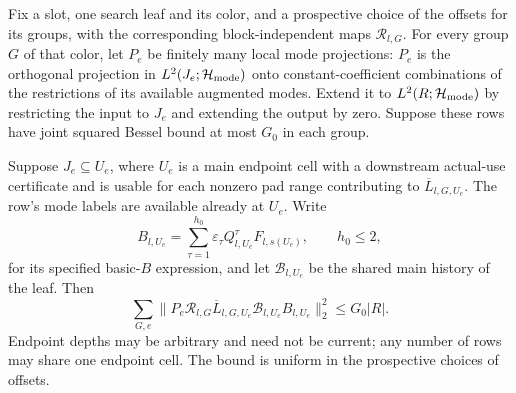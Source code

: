 \begin{lemma}
\label{lem:h-frozen-composition}
Fix a slot, one search leaf and its color, and a prospective choice
of the offsets for its groups, with the corresponding block-independent
maps \(\mathcal R_{l,G}\).  For every group \(G\) of that color, let \(P_e\) be finitely many
local mode projections: \(P_e\) is the orthogonal projection in
\(L^2(J_e;\mathcal H_{\rm mode})\) onto constant-coefficient combinations
of the restrictions of its available augmented modes.  Extend it to
\(L^2(R;\mathcal H_{\rm mode})\) by restricting the input to \(J_e\)
and extending the output by zero.  Suppose these rows have joint squared
Bessel bound at most \(G_0\) in each group.

Suppose \(J_e\subseteq U_e\), where \(U_e\) is a main endpoint
cell with a downstream actual-use certificate and is usable for
each nonzero pad range contributing to
\(\overline L_{l,G,U_e}\).  The row's mode labels are available
already at \(U_e\).  Write
\[
 B_{l,U_e}=\sum_{\tau=1}^{h_0}\varepsilon_\tau
       Q^\tau_{l,U_e}F_{l,s(U_e)},\qquad h_0\le2,
\]
for its specified basic-\(B\) expression, and let
\(\mathcal B_{l,U_e}\) be the shared main history of the leaf.
Then
\begin{equation}
 \sum_{G,e}
 \|P_e\mathcal R_{l,G}\overline L_{l,G,U_e}
                  \mathcal B_{l,U_e}B_{l,U_e}\|_2^2
       \le G_0|R|.
 \label{eq:h-frozen-composition}
\end{equation}
Endpoint depths may be arbitrary and need not be current; any
number of rows may share one endpoint cell.  The bound is uniform
in the prospective choices of offsets.
\end{lemma}

